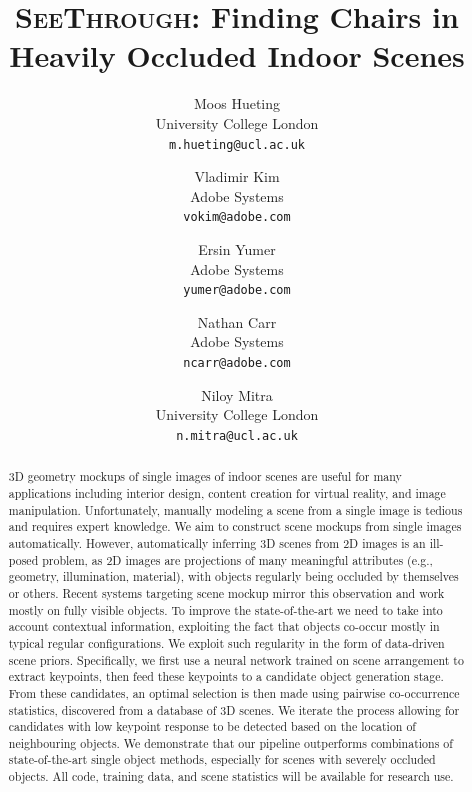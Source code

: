 \documentclass[10pt,twocolumn,letterpaper]{article}
\begin{document}
\title{\textsc{SeeThrough}: Finding Chairs in Heavily Occluded Indoor Scenes}

\author{Moos Hueting\\
University College London\\
{\tt\small m.hueting@ucl.ac.uk}
\and
Vladimir Kim\\
Adobe Systems\\
{\tt\small vokim@adobe.com}
\and
Ersin Yumer\\
Adobe Systems\\
{\tt\small yumer@adobe.com}
\and
Nathan Carr\\
Adobe Systems\\
{\tt\small ncarr@adobe.com}
\and
Niloy Mitra\\
University College London\\
{\tt\small n.mitra@ucl.ac.uk}
}

\maketitle

\begin{abstract}
    3D geometry mockups of single images of indoor scenes are useful for many
    applications including interior design, content creation for virtual reality,
    and image manipulation.  Unfortunately, manually modeling a scene from a single image is tedious and requires expert knowledge. We aim to construct
    scene mockups from single images automatically. However, automatically
    inferring 3D scenes from 2D images is an ill-posed problem, as 2D images
    are projections of many meaningful attributes (e.g., geometry, illumination, material), with objects regularly being occluded by themselves or others.
    Recent systems targeting scene mockup  mirror this
    observation and work mostly on fully visible objects. To improve the state-of-the-art we need to take into account contextual information,
    exploiting the fact that objects co-occur mostly in typical regular
    configurations. We exploit such regularity in the form of data-driven scene priors.  Specifically, we first use a neural network trained on scene arrangement to extract
    keypoints, then feed these keypoints to a candidate object generation
    stage. From these candidates, an optimal selection is then made using
    pairwise co-occurrence statistics, discovered from a database of 3D scenes.
    We iterate the process allowing for candidates with low keypoint
    response to be detected based on the location of neighbouring objects. We
    demonstrate that our pipeline outperforms combinations of state-of-the-art
    single object methods, especially for scenes with severely occluded
    objects. All code, training data, and scene statistics will be available for research use. 
\end{abstract}
\end{document}
